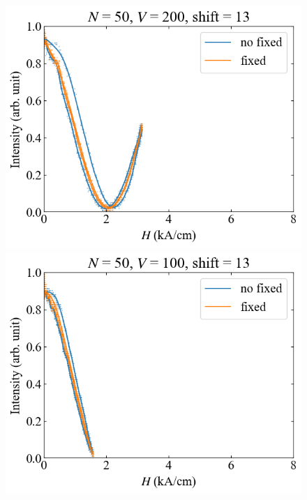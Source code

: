 \documentclass[9pt,dvipdfmx,a4paper]{jsarticle}
\begin{document}
\begin{figure}[H]
\begin{minipage}[t]{0.24\columnwidth}
        \centering
        \includegraphics[width = \columnwidth]{xy/15.png}
    \end{minipage}
    \hfill
    \begin{minipage}[t]{0.24\columnwidth}
        \centering
        \includegraphics[width = \columnwidth]{xy/16.png}
    \end{minipage}
\end{figure}
\end{document}
